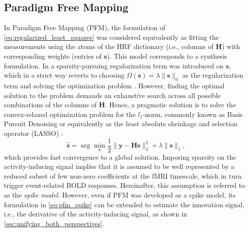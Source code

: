 
\subsection{Paradigm Free Mapping} In Paradigm Free Mapping (PFM), the formulation of
\cref{eq:regularized_least_squares} was considered equivalently as fitting the
measurements using the atoms of the HRF dictionary (i.e., columns of
$\mathbf{H}$) with corresponding weights (entries of $\mathbf{s}$). This model
corresponds to a synthesis formulation. In \cite{Gaudes2013Paradigmfreemapping}
a sparsity-pursuing regularization term was introduced on $\mathbf{s}$, which in
a strict way reverts to choosing \(\Omega(\mathbf{s})=\lambda \| \mathbf{s}
\|_0\) as the regularization term and solving the optimization problem
\citep{Bruckstein2009SparseSolutionsSystems}. However, finding the optimal
solution to the problem demands an exhaustive search across all possible
combinations of the columns of \(\mathbf{H}\). Hence, a  pragmatic solution is
to solve the convex-relaxed optimization problem for the \(l_1\)-norm, commonly
known as Basis Pursuit Denoising \citep{Chen2001Atomicdecompositionbasis} or
equivalently as the least absolute shrinkage and selection operator (LASSO)
\citep{Tibshirani1996RegressionShrinkageSelection}:
\begin{equation}
    \label{eq:pfm_spike}
    \hat{\mathbf{s}} = \arg \min_{\mathbf{s}} \frac{1}{2} \| \mathbf{y} - \mathbf{Hs} \|_2^2 + \lambda \| \mathbf{s} \|_1,
\end{equation}
which provides fast convergence to a global solution. Imposing sparsity on the
activity-inducing signal implies that it is assumed to be well represented by a
reduced subset of few non-zero coefficients at the fMRI timescale, which in turn
trigger event-related BOLD responses. Hereinafter, this assumption is referred
to as the \textit{spike model}. However, even if PFM was developed as a spike
model, its formulation in \cref{eq:pfm_spike} can be extended to estimate the
innovation signal, i.e., the derivative of the activity-inducing signal, as
shown in \cref{sec:unifying_both_perspectives}.


